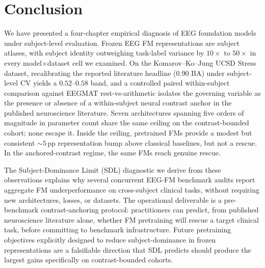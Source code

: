 \section{Conclusion}
\label{sec:conclusion}

We have presented a four-chapter empirical diagnosis of EEG
foundation models under subject-level evaluation. Frozen EEG
FM representations are subject atlases, with subject identity
outweighing task-label variance by $10\times$ to $50\times$ in every
model$\times$dataset cell we examined. On the Komarov--Ko--Jung UCSD
Stress dataset, recalibrating the reported literature headline
($0.90$ BA) under subject-level CV yields a $0.52$--$0.58$ band, and a
controlled paired within-subject comparison against EEGMAT
rest-vs-arithmetic isolates the governing variable as the presence
or absence of a within-subject neural contrast anchor in the
published neuroscience literature. Seven architectures spanning five
orders of magnitude in parameter count share the same ceiling on the
contrast-bounded cohort; none escape it. Inside the ceiling,
pretrained FMs provide a modest but consistent $\sim\!5$\,pp
representation bump above classical baselines, but not a rescue. In
the anchored-contrast regime, the same FMs reach genuine rescue.

The Subject-Dominance Limit (SDL) diagnostic we derive from these
observations explains why several concurrent EEG-FM benchmark audits
report aggregate FM underperformance on cross-subject clinical
tasks, without requiring new architectures, losses, or datasets. The
operational deliverable is a pre-benchmark contrast-anchoring
protocol: practitioners can predict, from published neuroscience
literature alone, whether FM pretraining will rescue a target
clinical task, before committing to benchmark infrastructure.
Future pretraining objectives explicitly designed to reduce
subject-dominance in frozen representations are a falsifiable
direction that SDL predicts should produce the largest gains
specifically on contrast-bounded cohorts.
